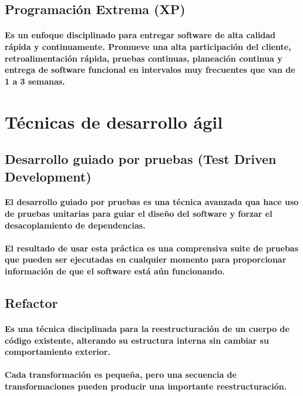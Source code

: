  \subsection{Programación Extrema (XP)}
  \paragraph{Es un enfoque disciplinado para entregar software de alta calidad rápida y continuamente. Promueve una alta participación del cliente, retroalimentación rápida, pruebas continuas, planeación continua y entrega de software funcional en intervalos muy frecuentes que van de 1 a 3 semanas.}
  
\section{Técnicas de desarrollo ágil}

\subsection{Desarrollo guiado por pruebas (Test Driven Development)}

  \paragraph{El desarrollo guiado por pruebas es una técnica avanzada qua hace uso de pruebas unitarias para guiar el diseño del software y forzar el desacoplamiento de dependencias.}
  \paragraph{El resultado de usar esta práctica es una comprensiva suite de pruebas que pueden ser ejecutadas en cualquier momento para proporcionar información de que el software está aún funcionando.}

\subsection{Refactor}
  \paragraph{Es una técnica disciplinada para la reestructuración de un cuerpo de código existente, alterando su estructura interna sin cambiar su comportamiento exterior.}
  \paragraph{Cada transformación es pequeña, pero una secuencia de transformaciones pueden producir una importante reestructuración.}

